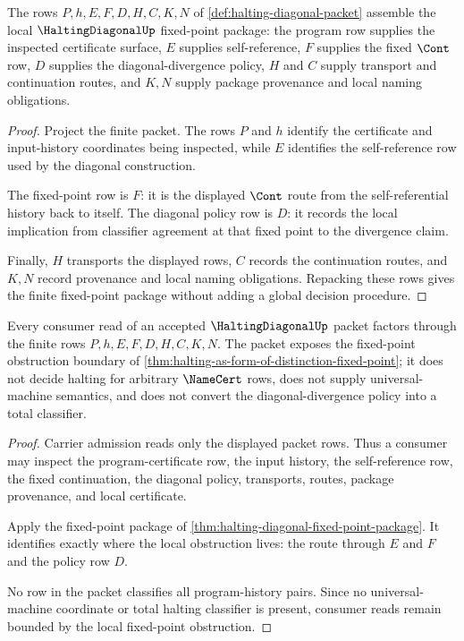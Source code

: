 \begin{theorem}\label{thm:halting-diagonal-fixed-point-package}
The rows $P,h,E,F,D,H,C,K,N$ of \autoref{def:halting-diagonal-packet} assemble the local $\HaltingDiagonalUp$ fixed-point package: the program row supplies the inspected certificate surface, $E$ supplies self-reference, $F$ supplies the fixed $\Cont$ row, $D$ supplies the diagonal-divergence policy, $H$ and $C$ supply transport and continuation routes, and $K,N$ supply package provenance and local naming obligations.
\end{theorem}
\begin{proof}
Project the finite packet. The rows $P$ and $h$ identify the certificate and input-history coordinates being inspected, while $E$ identifies the self-reference row used by the diagonal construction.

The fixed-point row is $F$: it is the displayed $\Cont$ route from the self-referential history back to itself. The diagonal policy row is $D$: it records the local implication from classifier agreement at that fixed point to the divergence claim.

Finally, $H$ transports the displayed rows, $C$ records the continuation routes, and $K,N$ record provenance and local naming obligations. Repacking these rows gives the finite fixed-point package without adding a global decision procedure.
\end{proof}

\begin{theorem}\label{thm:halting-diagonal-non-decision-boundary}
Every consumer read of an accepted $\HaltingDiagonalUp$ packet factors through the finite rows $P,h,E,F,D,H,C,K,N$. The packet exposes the fixed-point obstruction boundary of \autoref{thm:halting-as-form-of-distinction-fixed-point}; it does not decide halting for arbitrary $\NameCert$ rows, does not supply universal-machine semantics, and does not convert the diagonal-divergence policy into a total classifier.
\end{theorem}
\begin{proof}
Carrier admission reads only the displayed packet rows. Thus a consumer may inspect the program-certificate row, the input history, the self-reference row, the fixed continuation, the diagonal policy, transports, routes, package provenance, and local certificate.

Apply the fixed-point package of \autoref{thm:halting-diagonal-fixed-point-package}. It identifies exactly where the local obstruction lives: the route through $E$ and $F$ and the policy row $D$.

No row in the packet classifies all program-history pairs. Since no universal-machine coordinate or total halting classifier is present, consumer reads remain bounded by the local fixed-point obstruction.
\end{proof}

